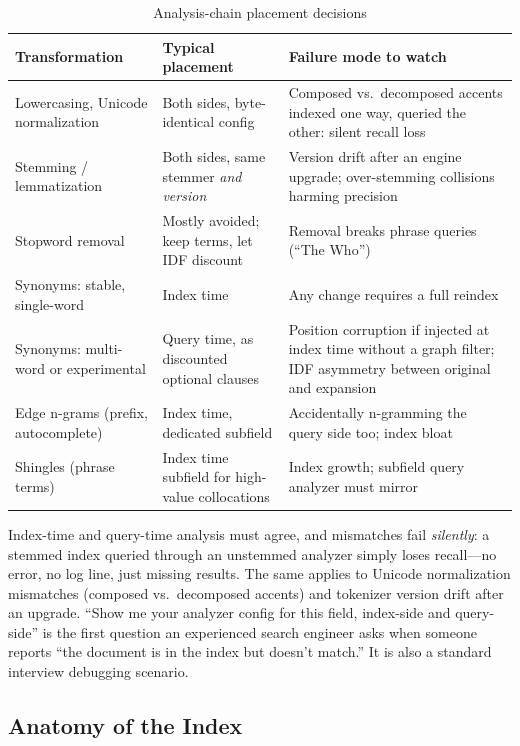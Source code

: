 \begin{table}[H]
\centering
\caption{Analysis-chain placement decisions}
\label{sr:tab:analyzer_placement}
\begin{tabularx}{\textwidth}{p{3.4cm}XX}
\toprule
\textbf{Transformation} & \textbf{Typical placement} & \textbf{Failure mode to watch} \\
\midrule
Lowercasing, Unicode normalization & Both sides, byte-identical config & Composed vs.\ decomposed accents indexed one way, queried the other: silent recall loss \\
Stemming / lemmatization & Both sides, same stemmer \emph{and version} & Version drift after an engine upgrade; over-stemming collisions harming precision \\
Stopword removal & Mostly avoided; keep terms, let IDF discount & Removal breaks phrase queries (``The Who'') \\
Synonyms: stable, single-word & Index time & Any change requires a full reindex \\
Synonyms: multi-word or experimental & Query time, as discounted optional clauses & Position corruption if injected at index time without a graph filter; IDF asymmetry between original and expansion \\
Edge n-grams (prefix, autocomplete) & Index time, dedicated subfield & Accidentally n-gramming the query side too; index bloat \\
Shingles (phrase terms) & Index time subfield for high-value collocations & Index growth; subfield query analyzer must mirror \\
\bottomrule
\end{tabularx}
\end{table}

\begin{warningbox}
Index-time and query-time analysis must agree, and mismatches fail \emph{silently}: a stemmed index queried through an unstemmed analyzer simply loses recall---no error, no log line, just missing results. The same applies to Unicode normalization mismatches (composed vs.\ decomposed accents) and tokenizer version drift after an upgrade. ``Show me your analyzer config for this field, index-side and query-side'' is the first question an experienced search engineer asks when someone reports ``the document is in the index but doesn't match.'' It is also a standard interview debugging scenario.
\end{warningbox}

\subsection{Anatomy of the Index}

